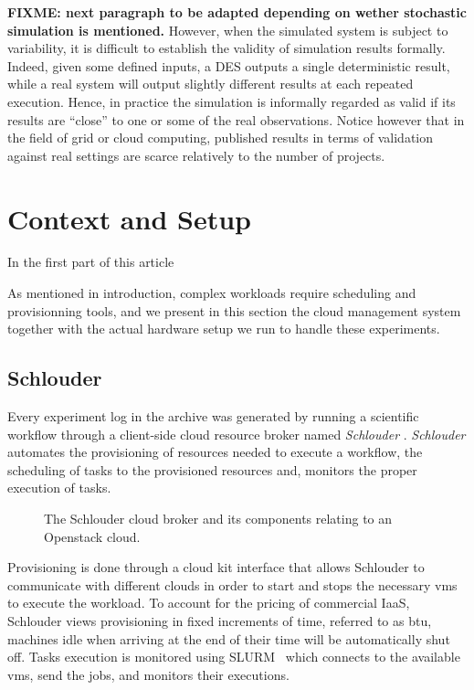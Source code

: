 \textbf{FIXME: next paragraph to be adapted depending on wether stochastic
  simulation is mentioned.}
However, when the simulated system is subject to variability, it is difficult to
establish  the  validity of  simulation  results  formally. Indeed,  given  some
defined inputs, a DES outputs a single deterministic result, while a real system
will output  slightly different results  at each repeated execution.   Hence, in
practice  the simulation  is informally  regarded as  valid if  its results  are
``close'' to one or  some of the real observations.  Notice  however that in the
field  of grid  or cloud  computing, published  results in  terms of  validation
against real settings are scarce relatively to the number of projects.


\section{Context and Setup}
\label{sc:context}

In the first part of this article

As  mentioned   in  introduction,  complex  workloads   require  scheduling  and
provisionning tools, and we present in  this section the cloud management system
together with the actual hardware setup we run to handle these experiments.

\subsection{Schlouder}

Every  experiment log  in  the archive  was generated  by  running a  scientific
workflow  through a  client-side  cloud resource  broker named  \emph{Schlouder}
\cite{Michon17}. \emph{Schlouder} automates the provisioning of resources needed
to execute a workflow, the scheduling of tasks to the provisioned resources and,
monitors the proper execution of tasks.
%
\begin{figure}
	\centering
	
	\caption{The Schlouder cloud broker and its components relating to an
	Openstack cloud.}
\end{figure}
%
Provisioning is  done through  a cloud  kit interface  that allows  Schlouder to
communicate with  different clouds  in order  to start  and stops  the necessary
\acp{vm} to  execute the  workload.  To  account for  the pricing  of commercial
IaaS, Schlouder views  provisioning in fixed increments of time,  referred to as
\ac{btu},  machines  idle  when arriving  at  the  end  of  their time  will  be
automatically shut off.
%
Tasks execution  is monitored using  SLURM~\cite{YooJG03} which connects  to the
available \acp{vm}, send the jobs, and monitors their executions.

